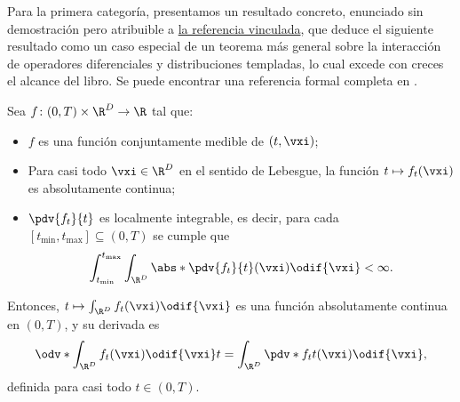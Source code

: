 \documentclass[../../book-main_es.tex]{subfiles}
\begin{document}
Para la primera categoría, presentamos un resultado concreto, enunciado sin 
demostración pero atribuible a 
\href{https://planetmath.org/differentiationundertheintegralsign}{la
referencia vinculada}, que deduce el siguiente resultado como un caso especial
de un teorema más general sobre la interacción de
operadores diferenciales y distribuciones templadas, lo cual excede con creces el alcance del
libro. Se puede encontrar una referencia formal completa en \cite{jones1982theory}.
\begin{proposition}\label{prop:dutis}
    Sea \(f \colon (0, T) \times \R^{D} \to \R\) tal que:
    \begin{itemize}
        \item \(f\) es una función conjuntamente medible de \((t, \vxi)\);
        \item Para casi todo \(\vxi \in \R^{D}\) en el sentido de Lebesgue, la
            función \(t \mapsto f_{t}(\vxi)\) es absolutamente continua;
        \item \(\pdv{f_{t}}{t}\) es localmente integrable, es decir, para
            cada \([t_{\min}, t_{\max}] \subseteq (0, T)\) se cumple que
            \begin{equation}
                \int_{t_{\min}}^{t_{\max}}\int_{\R^{D}}\abs*{\pdv{f_{t}}{t}(\vxi)}\odif{\vxi}
                < \infty.
            \end{equation}
    \end{itemize}
    Entonces, \(t \mapsto \int_{\R^{D}}f_{t}(\vxi)\odif{\vxi}\) es una
    función absolutamente continua en \((0, T)\), y su derivada es
    \begin{equation}
        \odv*{\int_{\R^{D}}f_{t}(\vxi)\odif{\vxi}}{t} =
        \int_{\R^{D}}\pdv*{f_{t}}{t}(\vxi)\odif{\vxi},
    \end{equation}
    definida para casi todo \(t \in (0, T)\).
\end{proposition}
\end{document}
